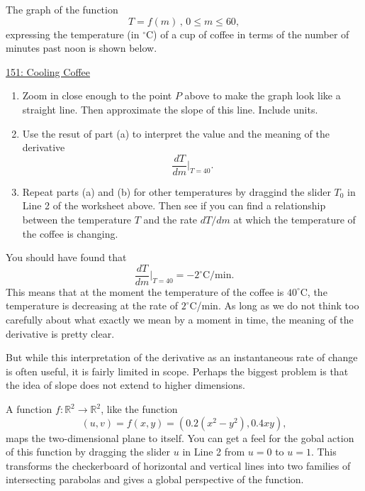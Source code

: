 \documentclass{ximera}
\begin{document}
\begin{example}  \label{Ex:KJDmft4thghhgdf}
The graph of the function 
\[
   T = f(m) \, ,  \, 0\leq m \leq 60,
\]
expressing the temperature (in $^\circ$C) of a cup of coffee in terms of the number of minutes past noon is shown below.

\begin{onlineOnly}
    \begin{center}
\end{center}
\end{onlineOnly}

\href{https://www.desmos.com/calculator/fuftb4mq0k}{151: Cooling Coffee}


\begin{enumerate}
\item Zoom in close enough to the point $P$ above to make the graph look like a straight line. Then approximate the slope of this line. Include units.

\item Use the resut of part (a) to interpret the value and the meaning of the derivative
\[
   \frac{dT}{dm} \Big|_{T=40} .
\]

\item Repeat parts (a) and (b) for other temperatures by draggind the slider $T_0$ in Line 2 of the worksheet above. Then see if you can find a relationship between the temperature $T$ and the rate $dT/dm$ at which the temperature of the coffee is changing. 

\end{enumerate}

You should have found that 
\[
    \frac{dT}{dm} \Big|_{T=40} = -2^\circ\text{C}/\text{min}.
\]
This means that at the moment the temperature of the coffee is $40^\circ$C, the temperature is decreasing at the rate of $2^\circ$C/min. As long as we do not think too carefully about what exactly we mean by a moment in time, the meaning of the derivative is pretty clear.

But while this interpretation of the derivative as an instantaneous rate of change is often useful, it is fairly limited in scope. Perhaps the biggest problem is that the idea of slope does not extend to higher dimensions. %

\end{example}

A function $f:\mathbb{R}^2\to \mathbb{R}^2$, like the function
\[
  (u,v) = f(x,y) = (0.2(x^2-y^2) , 0.4xy) ,
\]
maps the two-dimensional plane to itself. You can get a feel for the gobal action of this function by dragging the slider $u$ in Line 2 from $u=0$ to $u=1$. This transforms the checkerboard of horizontal and vertical lines into two families of intersecting parabolas and gives a global perspective of the function.
\end{document}
